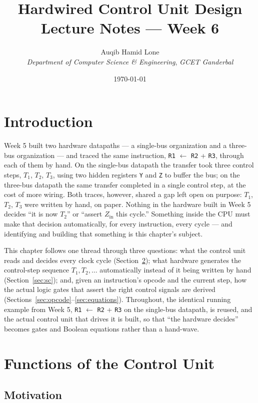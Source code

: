 \documentclass[11pt]{article}
\title{Hardwired Control Unit Design\\\large Lecture Notes --- Week 6}
\author{Auqib Hamid Lone\\[0.3em]
  \emph{Department of Computer Science \& Engineering}, \emph{GCET Ganderbal}}
\date{\today}
\begin{document}
\maketitle

\section{Introduction}

Week 5 built two hardware datapaths --- a single-bus organization and a three-bus organization --- and traced the same instruction, \texttt{R1} $\gets$ \texttt{R2} + \texttt{R3}, through each of them by hand. On the single-bus datapath the transfer took three control steps, $T_1$, $T_2$, $T_3$, using two hidden registers \texttt{Y} and \texttt{Z} to buffer the bus; on the three-bus datapath the same transfer completed in a single control step, at the cost of more wiring. Both traces, however, shared a gap left open on purpose: $T_1$, $T_2$, $T_3$ were written by hand, on paper. Nothing in the hardware built in Week 5 decides ``it is now $T_2$'' or ``assert $Z_{\text{in}}$ this cycle.'' Something inside the CPU must make that decision automatically, for every instruction, every cycle --- and identifying and building that something is this chapter's subject.

This chapter follows one thread through three questions: what the control unit reads and decides every clock cycle (Section~\ref{sec:functions}); what hardware generates the control-step sequence $T_1, T_2, \dots$ automatically instead of it being written by hand (Section~\ref{sec:sc}); and, given an instruction's opcode and the current step, how the actual logic gates that assert the right control signals are derived (Sections~\ref{sec:opcode}--\ref{sec:equations}). Throughout, the identical running example from Week 5, \texttt{R1} $\gets$ \texttt{R2} + \texttt{R3} on the single-bus datapath, is reused, and the actual control unit that drives it is built, so that ``the hardware decides'' becomes gates and Boolean equations rather than a hand-wave.

\section{Functions of the Control Unit}
\label{sec:functions}

\subsection{Motivation}
\end{document}
